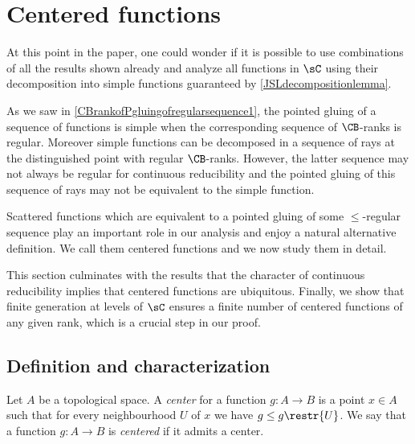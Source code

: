 
\chapter{Centered functions}\label{sectionCentered}

At this point in the paper, one could wonder if it is possible to use combinations of all the results shown already and analyze all functions in $\sC$
using their decomposition into simple functions guaranteed by \cref{JSLdecompositionlemma}.

As we saw in \cref{CBrankofPgluingofregularsequence1}, the pointed gluing of a sequence of functions is simple when the corresponding sequence of $\CB$-ranks is regular. Moreover simple functions can be decomposed in a sequence of rays at the distinguished point with regular $\CB$-ranks.
However, the latter sequence may not always be regular for continuous reducibility and the pointed gluing of this sequence of rays may not be equivalent to the simple function. %

Scattered functions which are equivalent to a pointed gluing of some $\leq$-regular sequence play an important role in our analysis and enjoy a natural alternative definition.
We call them centered functions and we now study them in detail.

This section culminates with the results that the \bqo{} character of continuous reducibility implies that centered functions are ubiquitous.
Finally, we show that finite generation at levels of $\sC$ ensures a finite number of centered functions of any given rank, which is a crucial step in our proof.


\section{Definition and characterization}\label{ssec:centered_def}

\begin{definition}
Let $A$ be a topological space. A \emph{center} for a function $g:A\to B$ is a point $x\in A$ such that for every neighbourhood $U$ of $x$ we have $g\leq g\restr{U}$.
We say that a function $g:A\to B$ is \emph{centered} if it admits a center.
\end{definition}

